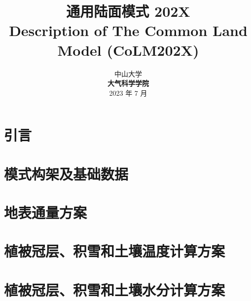 \documentclass[a4paper,12pt,twoside]{report}
\begin{document}
%

\title{\huge {\bf 通用陆面模式 202X}\\[3em]
\fontsize {22}{24}
\bf{ Description of The Common Land Model (CoLM202X)}\\[3in]
\fontsize {20}{23}%
}

\author{
 \large{ 中山大学 }\\[0.1in]
 {\bf 大气科学学院}\\[1in]
 \upshape
 \large%
2023 年 7 月
}

\maketitle

\preface

%
%
%
%

\body
\part{引言}

\part{模式构架及基础数据}



\part{地表通量方案}






\part{植被冠层、积雪和土壤温度计算方案}



\part{植被冠层、积雪和土壤水分计算方案}

\end{document}
